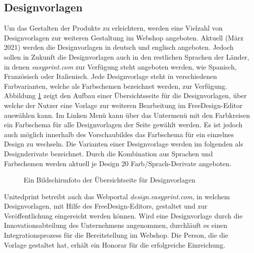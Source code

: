 \subsection{Designvorlagen}
\label{sect:Designvorlagen}
Um das Gestalten der Produkte zu erleichtern, werden eine Vielzahl von Designvorlagen zur weiteren Gestaltung im Webshop angeboten. 
Aktuell (März 2021) werden die Designvorlagen in deutsch und englisch angeboten. Jedoch sollen in Zukunft die Designvorlagen auch in den restlichen Sprachen der Länder, in denen \emph{easyprint.com} zur Verfügung steht angeboten werden, wie Spanisch, Französisch oder Italienisch. 
Jede Designvorlage steht in verschiedenen Farbvarianten, welche als Farbschemen bezeichnet werden, zur Verfügung. Abbildung \ref{fig:Designuebersichtseite} zeigt den Aufbau einer Übersichtsseite für die Designvorlagen, über welche der Nutzer eine Vorlage zur weiteren Bearbeitung im FreeDesign-Editor auswählen kann. Im Linken Menü kann über das Untermenü mit den Farbkreisen ein Farbschema für alle Designvorlagen der Seite gewählt werden. Es ist jedoch auch möglich innerhalb des Vorschaubildes das Farbschema für ein einzelnes Design zu wechseln.
Die Varianten einer Designvorlage werden im folgenden als Designderivate bezeichnet. 
Durch die Kombination aus Sprachen und Farbschemen werden aktuell je Design 20 Farb/Sprach-Derivate angeboten.
\begin{center}
\end{center}

\begin{figure}[H]
    \centering
    \caption{Ein Bildschirmfoto der Übersichtseite für Designvorlagen}
    \label{fig:Designuebersichtseite}
\end{figure}

Unitedprint betreibt auch das Webportal \emph{design.easyprint.com}, in welchem Designvorlagen, mit Hilfe des FreeDesign-Editors, gestaltet und zur Veröffentlichung eingereicht werden können. Wird eine Designvorlage durch die Innovationsabteilung des Unternehmens angenommen, durchläuft es einen Integrationsprozess für die Bereitstellung im Webshop. Die Person, die die Vorlage gestaltet hat, erhält ein Honorar für die erfolgreiche Einreichung.


